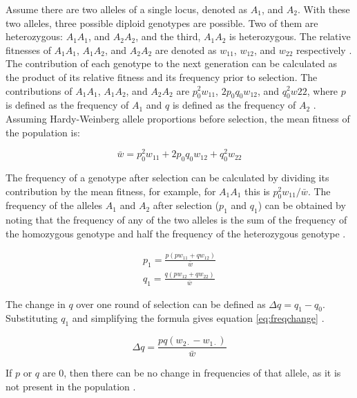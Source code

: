 Assume there are two alleles of a single locus, denoted as $A_1$, and $A_2$.
With these two alleles, three possible diploid genotypes are possible.
Two of them are heterozygous: $A_1A_1$, and $A_2A_2$, and the third, $A_1A_2$ is heterozygous.
The relative fitnesses of $A_1A_1$, $A_1A_2$, and $A_2A_2$ are denoted as $w_{11}$, $w_{12}$, and $w_{22}$ respectively \parencite{Wright1937}.
The contribution of each genotype to the next generation can be calculated as the product of its relative fitness and its frequency prior to selection.
The contributions of $A_1A_1$, $A_1A_2$, and $A_2A_2$ are $p_0^2w_{11}$, $2p_0q_0w_{12}$, and $q_0^2w{22}$, where $p$ is defined as the frequency of $A_1$ and $q$ is defined as the frequency of $A_2$ \parencite{Charlesworth2010,Hedrick2010}.
Assuming Hardy-Weinberg allele proportions before selection, the mean fitness of the population is:

\begin{equation} \label{eq:meanfit}
\bar{w}=p_0^2w_{11}+2p_0q_0w_{12}+q_0^2w_{22}
\end{equation}

The frequency of a genotype after selection can be calculated by dividing its contribution by the mean fitness, for example, for $A_1A_1$ this is $p_0^2w_{11} / \bar{w}$.
The frequency of the alleles $A_1$ and $A_2$ after selection ($p_1$ and $q_1$) can be obtained by noting that the frequency of any of the two alleles is the sum of the frequency of the homozygous genotype and half the frequency of the heterozygous genotype \parencite{Charlesworth2010,Hedrick2010}.

\begin{subequations}
\begin{align}
p_1=\frac{p(pw_{11}+qw_{12})}{\bar{w}}\\
q_1=\frac{q(pw_{12}+qw_{22})}{\bar{w}}
\end{align}
\end{subequations}

The change in $q$ over one round of selection can be
defined as $\Delta q=q_1-q_0$. Substituting $q_1$ and simplifying the 
formula gives equation \ref{eq:freqchange} \parencite{Charlesworth2010,Hedrick2010}.

\begin{equation} \label{eq:freqchange}
\Delta q = \frac{pq(w_{2\cdot} - w_{1\cdot})}{\bar{w}}
\end{equation}

If $p$ or $q$ are $0$, then there can be no change in frequencies of that allele, 
as it is not present in the population \parencite{Charlesworth2010,Hedrick2010}.

